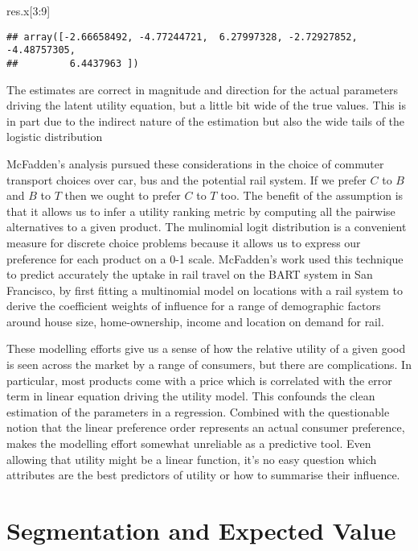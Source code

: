 \documentclass[]{tufte-book}
\newenvironment{Shaded}{}{}
\newcommand{\DecValTok}[1]{\textcolor[rgb]{0.25,0.63,0.44}{#1}}
\newcommand{\NormalTok}[1]{#1}
\theoremstyle{definition}
\theoremstyle{definition}
\theoremstyle{definition}
\theoremstyle{remark}
\begin{document}
\begin{Shaded}
\begin{Highlighting}[]
\NormalTok{res.x[}\DecValTok{3}\NormalTok{:}\DecValTok{9}\NormalTok{]}
\end{Highlighting}
\end{Shaded}

\begin{verbatim}
## array([-2.66658492, -4.77244721,  6.27997328, -2.72927852, -4.48757305,
##         6.4437963 ])
\end{verbatim}

The estimates are correct in magnitude and direction for the actual parameters driving the latent utility equation, but a little bit wide of the true values. This is in part due to the indirect nature of the estimation but also the wide tails of the logistic distribution

McFadden's analysis pursued these considerations in the choice of commuter transport choices over car, bus and the potential rail system. If we prefer \(C\) to \(B\) and \(B\) to \(T\) then we ought to prefer \(C\) to \(T\) too. The benefit of the assumption is that it allows us to infer a utility ranking metric by computing all the pairwise alternatives to a given product. The mulinomial logit distribution is a convenient measure for discrete choice problems because it allows us to express our preference for each product on a 0-1 scale. McFadden's work used this technique to predict accurately the uptake in rail travel on the BART system in San Francisco, by first fitting a multinomial model on locations with a rail system to derive the coefficient weights of influence for a range of demographic factors around house size, home-ownership, income and location on demand for rail.

These modelling efforts give us a sense of how the relative utility of a given good is seen across the market by a range of consumers, but there are complications. In particular, most products come with a price which is correlated with the error term in linear equation driving the utility model. This confounds the clean estimation of the parameters in a regression. Combined with the questionable notion that the linear preference order represents an actual consumer preference, makes the modelling effort somewhat unreliable as a predictive tool. Even allowing that utility might be a linear function, it's no easy question which attributes are the best predictors of utility or how to summarise their influence.

\hypertarget{segmentation-and-expected-value}{%
\section{Segmentation and Expected Value}\label{segmentation-and-expected-value}}
\end{document}
